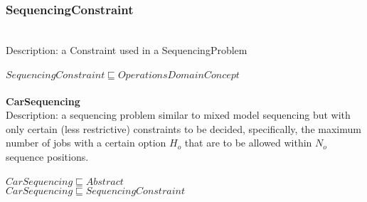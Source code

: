 \subsubsection{SequencingConstraint}\\
Description: a Constraint used in a SequencingProblem\\
\\$ SequencingConstraint \sqsubseteq OperationsDomainConcept$
\\\\   \textbf{CarSequencing}\\Description: a sequencing problem similar to mixed model sequencing but with only certain (less restrictive) constraints to be decided, specifically, the maximum number of jobs with a 
certain option $H_o$ that are to be allowed within $N_o$ sequence positions. \cite{Boysen2009}\\
\\$ CarSequencing \sqsubseteq Abstract$
\\$ CarSequencing \sqsubseteq SequencingConstraint$

